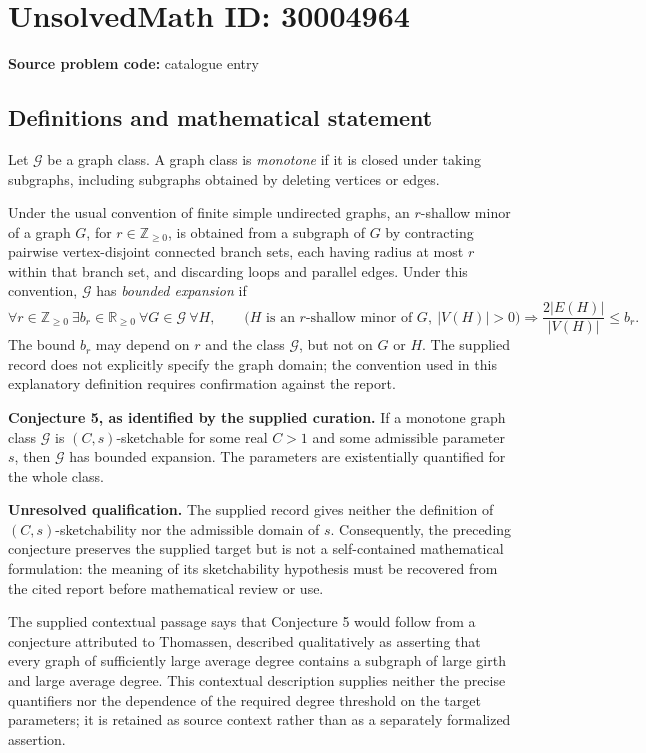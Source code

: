 \documentclass[11pt]{article}
\newcommand{\Z}{\mathbb{Z}}
\newcommand{\R}{\mathbb{R}}
\begin{document}
\section*{UnsolvedMath ID: 30004964}
\textbf{Source problem code:} catalogue entry
\subsection{Definitions and mathematical statement}
Let \(\mathcal G\) be a graph class. A graph class is \emph{monotone} if it is closed under taking subgraphs, including subgraphs obtained by deleting vertices or edges.

Under the usual convention of finite simple undirected graphs, an \(r\)-shallow minor of a graph \(G\), for \(r\in\Z_{\geq 0}\), is obtained from a subgraph of \(G\) by contracting pairwise vertex-disjoint connected branch sets, each having radius at most \(r\) within that branch set, and discarding loops and parallel edges. Under this convention, \(\mathcal G\) has \emph{bounded expansion} if
\[
\forall r\in\Z_{\geq 0}\ \exists b_r\in\R_{\geq 0}\ \forall G\in\mathcal G\ \forall H,
\qquad
\bigl(H\text{ is an }r\text{-shallow minor of }G,\ |V(H)|>0\bigr)
\Longrightarrow
\frac{2|E(H)|}{|V(H)|}\leq b_r.
\]
The bound \(b_r\) may depend on \(r\) and the class \(\mathcal G\), but not on \(G\) or \(H\). The supplied record does not explicitly specify the graph domain; the convention used in this explanatory definition requires confirmation against the report.

\textbf{Conjecture 5, as identified by the supplied curation.} If a monotone graph class \(\mathcal G\) is \((C,s)\)-sketchable for some real \(C>1\) and some admissible parameter \(s\), then \(\mathcal G\) has bounded expansion. The parameters are existentially quantified for the whole class.

\textbf{Unresolved qualification.} The supplied record gives neither the definition of \((C,s)\)-sketchability nor the admissible domain of \(s\). Consequently, the preceding conjecture preserves the supplied target but is not a self-contained mathematical formulation: the meaning of its sketchability hypothesis must be recovered from the cited report before mathematical review or use.

The supplied contextual passage says that Conjecture 5 would follow from a conjecture attributed to Thomassen, described qualitatively as asserting that every graph of sufficiently large average degree contains a subgraph of large girth and large average degree. This contextual description supplies neither the precise quantifiers nor the dependence of the required degree threshold on the target parameters; it is retained as source context rather than as a separately formalized assertion.
\end{document}
